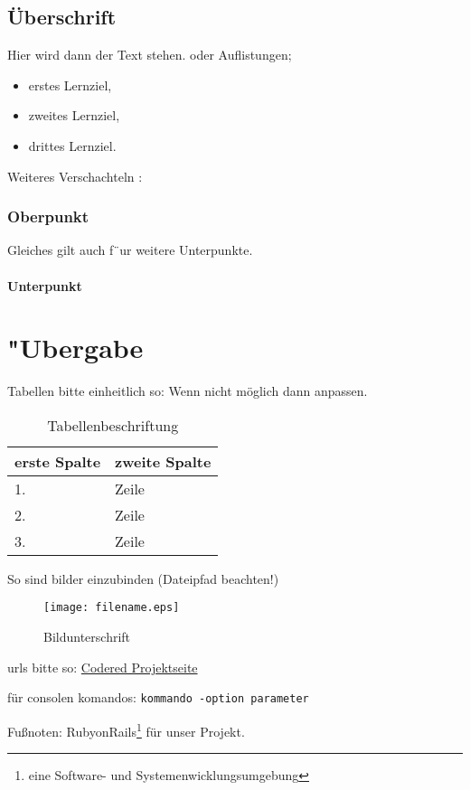 \chapter{Überschrift}  %
\label{chapter:Überschrift}  %

Hier wird dann der Text stehen. 
oder Auflistungen;
\begin{itemize}
\item erstes Lernziel,
\item zweites Lernziel,
\item drittes Lernziel.
\end{itemize}

Weiteres Verschachteln :

\section{Oberpunkt}
\label{section:Oberpunkt}

Gleiches gilt auch f¨ur weitere Unterpunkte.

\subsection{Unterpunkt}
\label{subsection:Unterpunkt}
\part{"Ubergabe}
\label{part:"Ubergabe}
%


Tabellen bitte einheitlich so:
Wenn nicht möglich dann anpassen.

\begin{table}[htbp]
\begin{center}
\begin{tabular*}{0.95\textwidth}{p{}p{}}
\hline
\textbf{erste Spalte} & \textbf{zweite Spalte} \\
\hline
1. & Zeile \\
2. & Zeile \\
3. & Zeile \\
\hline
\end{tabular*}
\caption{Tabellenbeschriftung}
\label{table:Tabellenbeschriftung}
\end{center}
\end{table}



So sind bilder einzubinden (Dateipfad beachten!)
\begin{figure}[htbp]
\centering
\texttt{[image: filename.eps]}
\caption{Bildunterschrift}
\label{figure:Bildunterschrift}
\end{figure}


urls bitte so:
\href{http://codered.berlios.de}{Codered Projektseite}


für consolen komandos:
\verb|kommando -option parameter|

Fußnoten:
RubyonRails\footnote{eine Software- und Systemenwicklungsumgebung} für unser Projekt.
